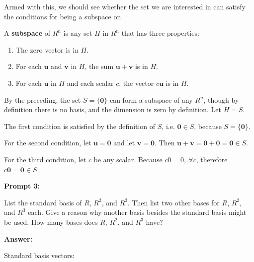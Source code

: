 \documentclass[10pt,letterpaper,final]{report}
\begin{document}
Armed with this, we should see whether the set we are interested in can satisfy the conditions for being a subspace on \textcite[Ch. 2.8, p. 155]{LayEtAl2020LinearAlgebraAndItsApplications}

\begin{tcolorbox}[colback=blue!10!white, colframe=blue!10!black, title=Definition - Subspace]
  A \textbf{subspace} of $R^n$ is any set $H$ in $R^n$ that has three properties:
  \begin{enumerate}[label=\alph*.]
    \item The zero vector is in $H$.
    \item For each $\mathbf{u}$ and $\mathbf{v}$ in $H$, the sum $\mathbf{u} + \mathbf{v}$ is in $H$.
    \item For each $\mathbf{u}$ in $H$ and each scalar $c$, the vector $c\mathbf{u}$ is in $H$.
  \end{enumerate}
\end{tcolorbox}

By the preceding, the set $S = \{\mathbf{0}\}$ can form a subspace of any $R^n$, though by definition there is no basis, and the dimension is zero by definition. Let $H = S$.

The first condition is satisfied by the definition of $S$, i.e. $\mathbf{0} \in S$, because $S = \{\mathbf{0}\}$.

For the second condition, let $\mathbf{u} = \mathbf{0}$ and let $\mathbf{v} = \mathbf{0}$. Then $\mathbf{u} + \mathbf{v} = \mathbf{0} + \mathbf{0} = \mathbf{0} \in S$.

For the third condition, let $c$ be any scalar. Because $c0 = 0,\ \forall c$, therefore $c\mathbf{0} = \mathbf{0} \in S$.

\pagebreak
\noindent\textbf{Prompt 3:}
\medskip

List the standard basis of $R$, $R^2$, and $R^3$.  Then list two other bases for $R$, $R^2$, and $R^3$ each. Give a reason why another basis besides the standard basis might be used.  How many bases does $R$, $R^2$, and $R^3$ have?

\medskip
\noindent\textbf{Answer:}
\medskip

Standard basis vectors:
\end{document}
